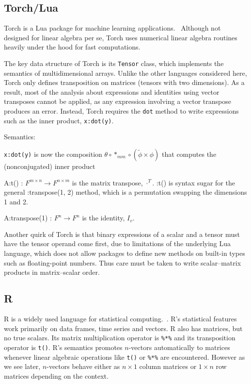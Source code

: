 \subsection{Torch/Lua}

Torch is a Lua\cite{Lua} package for machine learning applications.~\cite{Torch}
Although not designed for linear algebra per se, Torch uses numerical
linear algebra routines heavily under the hood for fast computations.

The key data structure of Torch is its \verb`Tensor` class, which
implements the semantics of multidimensional arrays. Unlike the other
languages considered here, Torch only defines transposition on matrices
(tensors with two dimensions). As a result, most of the analysis about
expressions and identities using vector transposes cannot be applied,
as any expression involving a vector transpose produces an error.
Instead, Torch requires the \verb`dot` method to write expressions
such as the inner product, \verb`x:dot(y)`.

Semantics:

\verb`x:dot(y)` is now the composition $\theta\circ*_{mm}\circ\left(\tilde{\phi}\times\phi\right)$
that computes the (nonconjugated) inner product

A:t() : $F^{m\times n}\rightarrow F^{n\times m}$ is the matrix transpose,
$\cdot^{T}$. :t() is syntax sugar for the general :transpose(1, 2)
method, which is a permutation swapping the dimensions 1 and 2.

A:transpose(1) : $F^{n}\rightarrow F^{n}$ is the identity, $I_{v}$.

Another quirk of Torch is that binary expressions of a scalar and
a tensor must have the tensor operand come first, due to limitations
of the underlying Lua language, which does not allow packages to define
new methods on built-in types such as floating-point numbers. Thus
care must be taken to write scalar–matrix products in matrix–scalar
order.

\subsection{R}

R is a widely used language for statistical computing.~\cite{Rlang}.
R's statistical features work primarily on data frames, time series
and vectors. R also has matrices, but no true scalars. Its matrix
multiplication operator is \verb`%*%` and its transposition operator
is \verb`t()`. R's semantics promotes $n$-vectors automatically
to matrices whenever linear algebraic operations like \verb`t()`
or \verb`%*%` are encountered. However as we see later, $n$-vectors
behave either as $n\times1$ column matrices or $1\times n$ row matrices
depending on the context.

